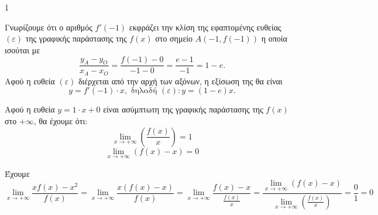 \begin{ylh}{1}
    \item [Ύλη από εικόνα]
\end{ylh}
\begin{alist}
\item Γνωρίζουμε ότι ο αριθμός $f'(-1)$ εκφράζει την κλίση της εφαπτομένης ευθείας $(\varepsilon)$ της γραφικής παράστασης της $f(x)$ στο σημείο $A(-1,f(-1))$ η οποία ισούται με
\[ \frac{y_A - y_O}{x_A - x_O} = \frac{f(-1) - 0}{-1 - 0} = \frac{e-1}{-1} = 1 - e. \]
Αφού η ευθεία $(\varepsilon)$ διέρχεται από την αρχή των αξόνων, η εξίσωση της θα είναι
\[ y = f'(-1) \cdot x, \text{ δηλαδή } (\varepsilon):y = (1 - e)x. \]
\item Αφού η ευθεία $y = 1 \cdot x + 0$ είναι ασύμπτωτη της γραφικής παράστασης της $f(x)$ στο $+\infty$, θα έχουμε ότι:
\[ \lim_{x \to +\infty} \left(\frac{f(x)}{x}\right) = 1 \]
\[ \lim_{x \to +\infty} (f(x) - x) = 0 \]
\item Έχουμε
\[ \lim_{x \to +\infty} \frac{xf(x) - x^2}{f(x)} = \lim_{x \to +\infty} \frac{x(f(x) - x)}{f(x)} = \lim_{x \to +\infty} \frac{f(x) - x}{\frac{f(x)}{x}} = \frac{\lim_{x \to +\infty} (f(x) - x)}{\lim_{x \to +\infty} \left(\frac{f(x)}{x}\right)} = \frac{0}{1} = 0 \]
\end{alist}